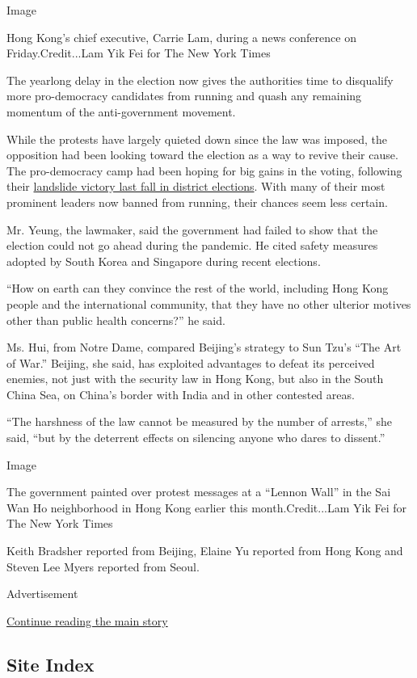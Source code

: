 Image

Hong Kong's chief executive, Carrie Lam, during a news conference on
Friday.Credit...Lam Yik Fei for The New York Times

The yearlong delay in the election now gives the authorities time to
disqualify more pro-democracy candidates from running and quash any
remaining momentum of the anti-government movement.

While the protests have largely quieted down since the law was imposed,
the opposition had been looking toward the election as a way to revive
their cause. The pro-democracy camp had been hoping for big gains in the
voting, following their
\href{https://www.nytimes.com/2019/11/25/world/asia/hong-kong-election-protests.html}{landslide
victory last fall in district elections}. With many of their most
prominent leaders now banned from running, their chances seem less
certain.

Mr. Yeung, the lawmaker, said the government had failed to show that the
election could not go ahead during the pandemic. He cited safety
measures adopted by South Korea and Singapore during recent elections.

``How on earth can they convince the rest of the world, including Hong
Kong people and the international community, that they have no other
ulterior motives other than public health concerns?'' he said.

Ms. Hui, from Notre Dame, compared Beijing's strategy to Sun Tzu's ``The
Art of War.'' Beijing, she said, has exploited advantages to defeat its
perceived enemies, not just with the security law in Hong Kong, but also
in the South China Sea, on China's border with India and in other
contested areas.

``The harshness of the law cannot be measured by the number of
arrests,'' she said, ``but by the deterrent effects on silencing anyone
who dares to dissent.''

Image

The government painted over protest messages at a ``Lennon Wall'' in the
Sai Wan Ho neighborhood in Hong Kong earlier this month.Credit...Lam Yik
Fei for The New York Times

Keith Bradsher reported from Beijing, Elaine Yu reported from Hong Kong
and Steven Lee Myers reported from Seoul.

Advertisement

\protect\hyperlink{after-bottom}{Continue reading the main story}

\hypertarget{site-index}{%
\subsection{Site Index}\label{site-index}}

